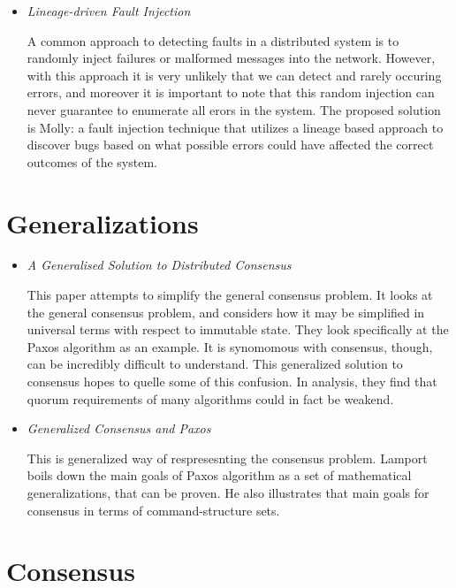 \documentclass{article}
\begin{document}
\begin{itemize}
	\item
	\textit{Lineage-driven Fault Injection} \cite{Molly}

	A common approach to detecting faults in a distributed system is to randomly inject failures or malformed messages into the network.
	However, with this approach it is very unlikely that we can detect and rarely occuring errors, and moreover it is important to note that this random injection can never guarantee to enumerate all erors in the system.
	The proposed solution is Molly: a fault injection technique that utilizes a lineage based approach to discover bugs based on what possible errors could have affected the correct outcomes of the system.
	
\end{itemize}

\section{Generalizations}

\begin{itemize}

	\item
	\textit{A Generalised Solution to Distributed Consensus} \cite{HowardGeneralized}

	This paper attempts to simplify the general consensus problem. It looks at the general consensus problem, and considers how it may be simplified in universal terms with respect to immutable state. They look specifically at the Paxos algorithm as an example. 
	It is synomomous with consensus, though, can be incredibly difficult to understand. This generalized solution to consensus hopes to quelle some of this confusion.
	In analysis, they find that quorum requirements of many algorithms could in fact be weakend.

	\item
	\textit{Generalized Consensus and Paxos} \cite{lamport2005generalized}

	This is generalized way of respresesnting the consensus problem.
	Lamport boils down the main goals of Paxos algorithm as a set of mathematical generalizations, that can be proven. He also illustrates that main goals for consensus in terms of command-structure sets.


\end{itemize}

\section{Consensus}
\end{document}
